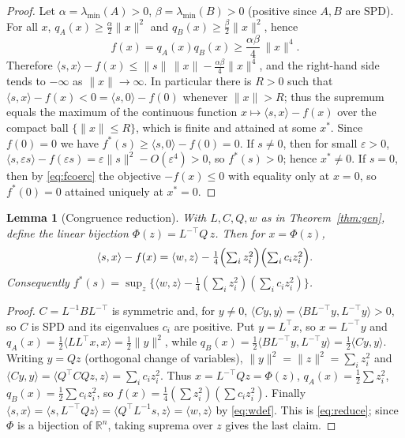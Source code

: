 \documentclass{amsart}
\newtheorem{lemma}{Lemma}
\theoremstyle{definition}
\begin{document}
\begin{proof}
Let $\alpha=\lambda_{\min}(A)>0$, $\beta=\lambda_{\min}(B)>0$ (positive since $A,B$ are SPD).
For all $x$, $q_A(x)\ge\frac{\alpha}{2}\|x\|^2$ and $q_B(x)\ge\frac{\beta}{2}\|x\|^2$, hence
\begin{equation}\label{eq:fcoerc}
f(x)=q_A(x)q_B(x)\ge\frac{\alpha\beta}{4}\,\|x\|^4 .
\end{equation}
Therefore $\langle s,x\rangle-f(x)\le\|s\|\,\|x\|-\frac{\alpha\beta}{4}\|x\|^4$, and the right-hand
side tends to $-\infty$ as $\|x\|\to\infty$.  In particular there is $R>0$ such that
$\langle s,x\rangle-f(x)<0=\langle s,0\rangle-f(0)$ whenever $\|x\|>R$; thus the supremum equals the
maximum of the continuous function $x\mapsto\langle s,x\rangle-f(x)$ over the compact ball
$\{\|x\|\le R\}$, which is finite and attained at some $x^\ast$.  Since $f(0)=0$ we have
$f^\ast(s)\ge\langle s,0\rangle-f(0)=0$.  If $s\ne0$, then for small $\varepsilon>0$,
$\langle s,\varepsilon s\rangle-f(\varepsilon s)=\varepsilon\|s\|^2-O(\varepsilon^4)>0$, so
$f^\ast(s)>0$; hence $x^\ast\ne0$.  If $s=0$, then by \eqref{eq:fcoerc} the objective $-f(x)\le0$
with equality only at $x=0$, so $f^\ast(0)=0$ attained uniquely at $x^\ast=0$.
\end{proof}

\begin{lemma}[Congruence reduction]\label{lem:reduce}
With $L,C,Q,w$ as in Theorem~\ref{thm:gen}, define the linear bijection
$\Phi(z)=L^{-\top}Q\,z$.  Then for $x=\Phi(z)$,
\begin{equation}\label{eq:reduce}
\langle s,x\rangle-f(x)=\langle w,z\rangle-\tfrac14\Bigl(\textstyle\sum_i z_i^2\Bigr)
\Bigl(\textstyle\sum_i c_i z_i^2\Bigr).
\end{equation}
Consequently $f^\ast(s)=\sup_{z}\bigl\{\langle w,z\rangle-\tfrac14(\sum_i z_i^2)(\sum_i c_iz_i^2)\bigr\}$.
\end{lemma}

\begin{proof}
$C=L^{-1}BL^{-\top}$ is symmetric and, for $y\ne0$, $\langle Cy,y\rangle=\langle B L^{-\top}y,L^{-\top}y\rangle>0$,
so $C$ is SPD and its eigenvalues $c_i$ are positive.  Put $y=L^{\top}x$, so $x=L^{-\top}y$ and
$q_A(x)=\tfrac12\langle LL^{\top}x,x\rangle=\tfrac12\|y\|^2$, while
$q_B(x)=\tfrac12\langle B L^{-\top}y,L^{-\top}y\rangle=\tfrac12\langle Cy,y\rangle$.  Writing
$y=Qz$ (orthogonal change of variables), $\|y\|^2=\|z\|^2=\sum_iz_i^2$ and
$\langle Cy,y\rangle=\langle Q^{\top}CQ z,z\rangle=\sum_i c_iz_i^2$.  Thus $x=L^{-\top}Qz=\Phi(z)$,
$q_A(x)=\tfrac12\sum z_i^2$, $q_B(x)=\tfrac12\sum c_iz_i^2$, so
$f(x)=\tfrac14(\sum z_i^2)(\sum c_iz_i^2)$.  Finally
$\langle s,x\rangle=\langle s,L^{-\top}Qz\rangle=\langle Q^{\top}L^{-1}s,z\rangle=\langle w,z\rangle$
by \eqref{eq:wdef}.  This is \eqref{eq:reduce}; since $\Phi$ is a bijection of $\mathbb R^n$,
taking suprema over $z$ gives the last claim.
\end{proof}
\end{document}
